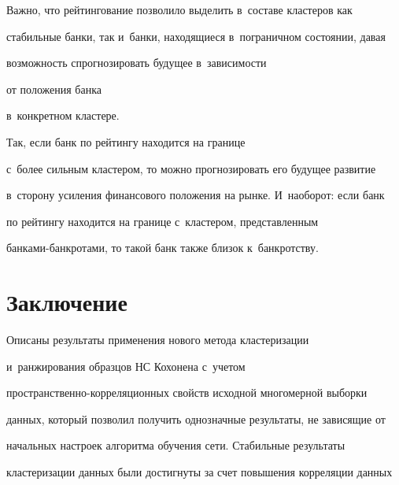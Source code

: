   


  








  Важно, что рейтингование позволило выделить в~составе кластеров как 


стабильные банки, так и~банки, находящиеся в~пограничном состоянии, давая 


возможность спрогнозировать будущее в~зависимости 


от положения банка 


в~конкретном кластере. 


Так, если банк по рейтингу находится на границе 


с~более сильным кластером, то можно прогнозировать его будущее развитие 


в~сторону усиления финансового положения на рынке. И~наоборот: если банк 


по рейтингу находится на границе с~кластером, представленным  


бан\-ка\-ми-банк\-ро\-та\-ми, то такой банк также близок к~банкротству.


  







\section{Заключение}










  Описаны результаты применения нового метода кластеризации 


и~ранжирования образцов НС Кохонена с~учетом 


пространственно-кор\-ре\-ля\-ци\-он\-ных свойств исходной многомерной выборки 


данных, который позволил получить однозначные результаты, не зависящие от 


начальных настроек алгоритма обучения сети. Стабильные результаты 


кластеризации данных были достигнуты за счет повышения корреляции данных 



